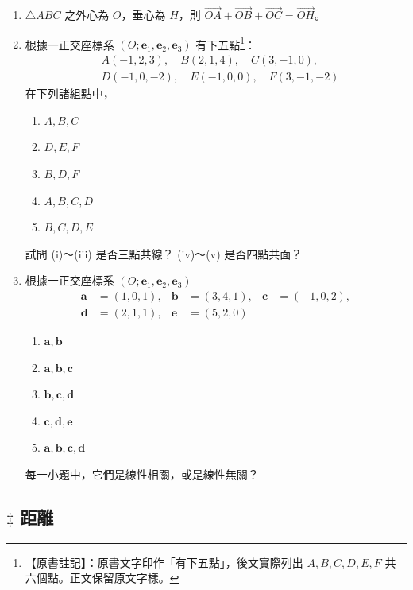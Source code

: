 \begin{enumerate}[leftmargin=2em]
  \item $\triangle ABC$ 之外心為 $O$，垂心為 $H$，則 $\vec{OA} + \vec{OB} + \vec{OC} = \vec{OH}$。
  \item[\textbf{*3.}] 根據一正交座標系 $(O; \mathbf{e}_1, \mathbf{e}_2, \mathbf{e}_3)$ 有下五點\label{note:b3s-ch5-p231-ex3-points}\footnote{【原書註記】：原書文字印作「有下五點」，後文實際列出 $A, B, C, D, E, F$ 共六個點。正文保留原文字樣。}：
  \begin{align*}
  &A(-1, 2, 3),\quad B(2, 1, 4),\quad C(3, -1, 0), \\
  &D(-1, 0, -2),\quad E(-1, 0, 0),\quad F(3, -1, -2)
  \end{align*}
  在下列諸組點中，
  \begin{enumerate}[label=(\roman*), leftmargin=2.5em]
    \item $A, B, C$
    \item $D, E, F$
    \item $B, D, F$
    \item $A, B, C, D$
    \item $B, C, D, E$
  \end{enumerate}
  試問 (i)～(iii) 是否三點共線？ (iv)～(v) 是否四點共面？
  \item[\textbf{*4.}] 根據一正交座標系 $(O; \mathbf{e}_1, \mathbf{e}_2, \mathbf{e}_3)$
  \begin{align*}
  \mathbf{a} &= (1, 0, 1), & \mathbf{b} &= (3, 4, 1), & \mathbf{c} &= (-1, 0, 2), \\
  \mathbf{d} &= (2, 1, 1), & \mathbf{e} &= (5, 2, 0)
  \end{align*}
  \begin{enumerate}[label=(\roman*), leftmargin=2.5em]
    \item $\mathbf{a}, \mathbf{b}$
    \item $\mathbf{a}, \mathbf{b}, \mathbf{c}$
    \item $\mathbf{b}, \mathbf{c}, \mathbf{d}$
    \item $\mathbf{c}, \mathbf{d}, \mathbf{e}$
    \item $\mathbf{a}, \mathbf{b}, \mathbf{c}, \mathbf{d}$
  \end{enumerate}
  每一小題中，它們是線性相關，或是線性無關？
\end{enumerate}

\subsection{\texorpdfstring{$\ddagger$ }{‡ }距離}\label{sec:b3s-5-2}

